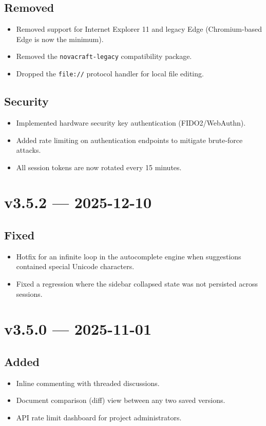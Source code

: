 \documentclass[
    language=english,
    doctype=article,
    institution=none,
]{../../omnilatex}
\begin{document}
\subsection{Removed}
\begin{itemize}
    \item Removed support for Internet Explorer 11 and legacy Edge
          (Chromium-based Edge is now the minimum).
    \item Removed the \texttt{novacraft-legacy} compatibility package.
    \item Dropped the \texttt{file://} protocol handler for local file
          editing.
\end{itemize}

\subsection{Security}
\begin{itemize}
    \item Implemented hardware security key authentication (FIDO2/WebAuthn).
    \item Added rate limiting on authentication endpoints to mitigate
          brute-force attacks.
    \item All session tokens are now rotated every 15 minutes.
\end{itemize}

\section{v3.5.2 --- 2025-12-10}

\subsection{Fixed}
\begin{itemize}
    \item Hotfix for an infinite loop in the autocomplete engine when
          suggestions contained special Unicode characters.
    \item Fixed a regression where the sidebar collapsed state was not
          persisted across sessions.
\end{itemize}

\section{v3.5.0 --- 2025-11-01}

\subsection{Added}
\begin{itemize}
    \item Inline commenting with threaded discussions.
    \item Document comparison (diff) view between any two saved versions.
    \item API rate limit dashboard for project administrators.
\end{itemize}
\end{document}
